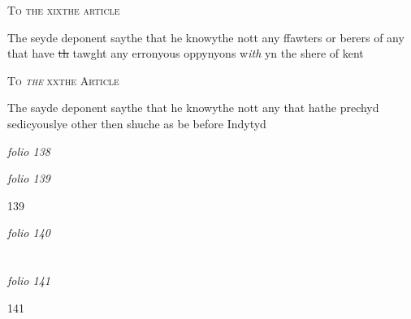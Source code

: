 \documentclass[12pt, a4paper]{book}
\begin{document}
 	
 		
				\begin{center}  {\scshape To the xixthe article}  \end{center}
			
 	
		\ifthenelse{\isodd{\thepage}}
		{\reversemarginpar}
		{\normalmarginpar}
		The seyde deponent saythe that he knowythe nott any ffawters or berers of any that have \sout{th }tawght any erronyous oppynyons w\textit{ith} yn the shere of kent 
 	
 	
 		
				\begin{center}  {\scshape To \textit{the} xxthe Article }  \end{center}
			
 		
		\ifthenelse{\isodd{\thepage}}
		{\reversemarginpar}
		{\normalmarginpar}
		The sayde deponent saythe that he knowythe nott any that hathe prechyd sedicyouslye other then shuche as be before Indytyd
 	

\dotfill
						\newpage
{}

\textit{folio 138}


         \vspace*{4cm}
         
\dotfill
						

\textit{folio 139}


\begin{flushright}{\color{Mahogany}139}\end{flushright}

\dotfill
						\newpage
{}

\textit{folio 140}


         \vspace*{4cm}
         
\dotfill
						  \section*{}  \subsection*{}

\textit{folio 141}



\begin{flushright}{\color{Mahogany}141}\end{flushright}
            		
\end{document}
